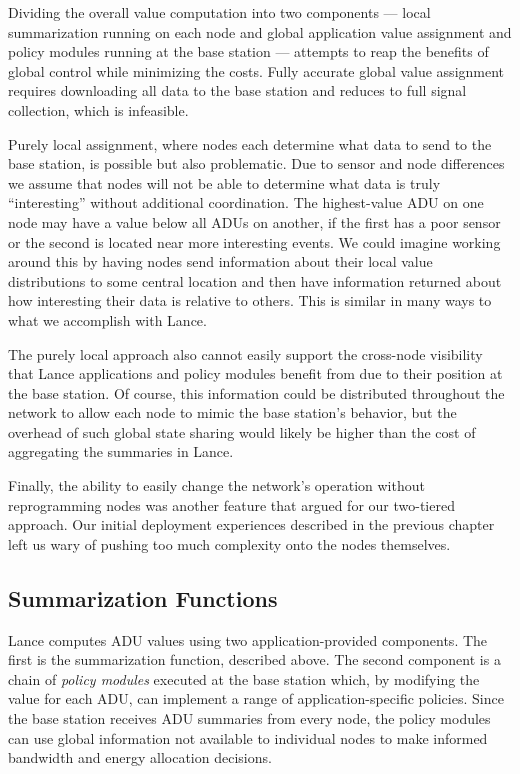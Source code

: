 Dividing the overall value computation into two components --- local
summarization running on each node and global application value assignment
and policy modules running at the base station --- attempts to reap the
benefits of global control while minimizing the costs. Fully accurate global
value assignment requires downloading all data to the base station and
reduces to full signal collection, which is infeasible.

Purely local assignment, where nodes each determine what data to send to the
base station, is possible but also problematic. Due to sensor and node
differences we assume that nodes will not be able to determine what data is
truly ``interesting'' without additional coordination. The highest-value ADU
on one node may have a value below all ADUs on another, if the first has a
poor sensor or the second is located near more interesting events. We could
imagine working around this by having nodes send information about their
local value distributions to some central location and then have information
returned about how interesting their data is relative to others. This is
similar in many ways to what we accomplish with Lance.

The purely local approach also cannot easily support the cross-node
visibility that Lance applications and policy modules benefit from due to
their position at the base station. Of course, this information could be
distributed throughout the network to allow each node to mimic the base
station's behavior, but the overhead of such global state sharing would
likely be higher than the cost of aggregating the summaries in Lance.

Finally, the ability to easily change the network's operation without
reprogramming nodes was another feature that argued for our two-tiered
approach. Our initial deployment experiences described in the previous
chapter left us wary of pushing too much complexity onto the nodes
themselves.

\subsection{Summarization Functions}

Lance computes ADU values using two application-provided components. The
first is the summarization function, described above. The second component is
a chain of \textit{policy modules} executed at the base station which, by
modifying the value for each ADU, can implement a range of
application-specific policies. Since the base station receives ADU summaries
from every node, the policy modules can use global information not available
to individual nodes to make informed bandwidth and energy allocation
decisions.

